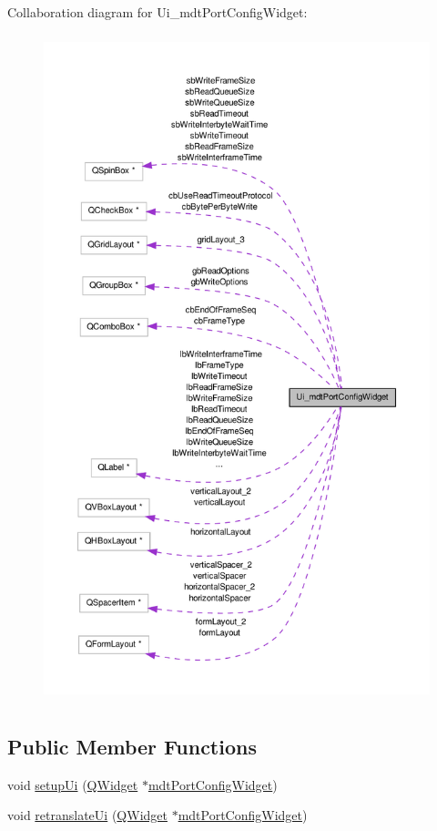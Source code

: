 Collaboration diagram for Ui\-\_\-mdt\-Port\-Config\-Widget\-:\nopagebreak
\begin{figure}[H]
\begin{center}
\leavevmode
\includegraphics[height=550pt]{class_ui__mdt_port_config_widget__coll__graph}
\end{center}
\end{figure}
\subsection*{Public Member Functions}
\begin{DoxyCompactItemize}
\item 
void \hyperlink{class_ui__mdt_port_config_widget_a6d31592db1dc60b49f4576d6aba13b52}{setup\-Ui} (\hyperlink{class_q_widget}{Q\-Widget} $\ast$\hyperlink{classmdt_port_config_widget}{mdt\-Port\-Config\-Widget})
\item 
void \hyperlink{class_ui__mdt_port_config_widget_ab022687e43d0070dea283dc1f9386869}{retranslate\-Ui} (\hyperlink{class_q_widget}{Q\-Widget} $\ast$\hyperlink{classmdt_port_config_widget}{mdt\-Port\-Config\-Widget})
\end{DoxyCompactItemize}
